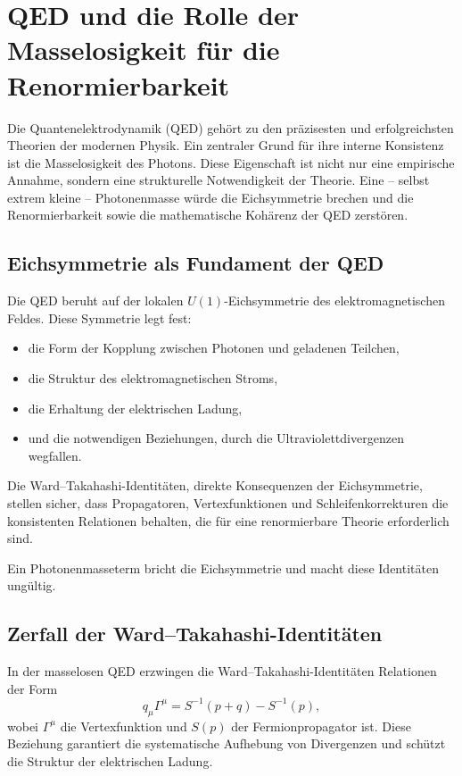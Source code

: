 \section{QED und die Rolle der Masselosigkeit für die Renormierbarkeit}

Die Quantenelektrodynamik (QED) gehört zu den präzisesten und erfolgreichsten 
Theorien der modernen Physik. Ein zentraler Grund für ihre interne 
Konsistenz ist die Masselosigkeit des Photons. Diese Eigenschaft ist nicht 
nur eine empirische Annahme, sondern eine strukturelle Notwendigkeit der 
Theorie. Eine – selbst extrem kleine – Photonenmasse würde die 
Eichsymmetrie brechen und die Renormierbarkeit sowie die mathematische 
Kohärenz der QED zerstören.

\subsection*{Eichsymmetrie als Fundament der QED}

Die QED beruht auf der lokalen $U(1)$-Eichsymmetrie des elektromagnetischen 
Feldes. Diese Symmetrie legt fest:

\begin{itemize}
	\item die Form der Kopplung zwischen Photonen und geladenen Teilchen,
	\item die Struktur des elektromagnetischen Stroms,
	\item die Erhaltung der elektrischen Ladung,
	\item und die notwendigen Beziehungen, durch die Ultraviolettdivergenzen 
	wegfallen.
\end{itemize}

Die Ward–Takahashi-Identitäten, direkte Konsequenzen der Eichsymmetrie, 
stellen sicher, dass Propagatoren, Vertexfunktionen und Schleifenkorrekturen 
die konsistenten Relationen behalten, die für eine renormierbare Theorie 
erforderlich sind.

Ein Photonenmasseterm bricht die Eichsymmetrie und macht diese Identitäten 
ungültig.

\subsection*{Zerfall der Ward–Takahashi-Identitäten}

In der masselosen QED erzwingen die Ward–Takahashi-Identitäten Relationen 
der Form
\[
q_\mu \Gamma^\mu = S^{-1}(p+q) - S^{-1}(p),
\]
wobei $\Gamma^\mu$ die Vertexfunktion und $S(p)$ der Fermionpropagator ist.  
Diese Beziehung garantiert die systematische Aufhebung von Divergenzen und 
schützt die Struktur der elektrischen Ladung.

